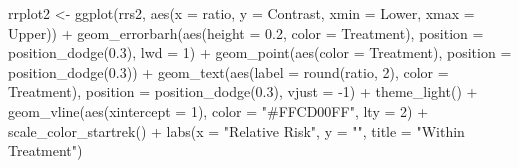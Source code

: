 \documentclass[12pt]{article}
\newenvironment{Shaded}{\begin{snugshade}}{\end{snugshade}}
\newcommand{\AttributeTok}[1]{\textcolor[rgb]{0.77,0.63,0.00}{#1}}
\newcommand{\DecValTok}[1]{\textcolor[rgb]{0.00,0.00,0.81}{#1}}
\newcommand{\FloatTok}[1]{\textcolor[rgb]{0.00,0.00,0.81}{#1}}
\newcommand{\FunctionTok}[1]{\textcolor[rgb]{0.00,0.00,0.00}{#1}}
\newcommand{\NormalTok}[1]{#1}
\newcommand{\OtherTok}[1]{\textcolor[rgb]{0.56,0.35,0.01}{#1}}
\newcommand{\SpecialCharTok}[1]{\textcolor[rgb]{0.00,0.00,0.00}{#1}}
\newcommand{\StringTok}[1]{\textcolor[rgb]{0.31,0.60,0.02}{#1}}
\begin{document}
\begin{Shaded}
\begin{Highlighting}[]
\NormalTok{rrplot2 }\OtherTok{\textless{}{-}} \FunctionTok{ggplot}\NormalTok{(rrs2, }\FunctionTok{aes}\NormalTok{(}\AttributeTok{x =}\NormalTok{ ratio, }\AttributeTok{y =}\NormalTok{ Contrast, }\AttributeTok{xmin =}\NormalTok{ Lower, }\AttributeTok{xmax =}\NormalTok{ Upper)) }\SpecialCharTok{+}
  \FunctionTok{geom\_errorbarh}\NormalTok{(}\FunctionTok{aes}\NormalTok{(}\AttributeTok{height =} \FloatTok{0.2}\NormalTok{, }\AttributeTok{color =}\NormalTok{ Treatment),}
                 \AttributeTok{position =} \FunctionTok{position\_dodge}\NormalTok{(}\FloatTok{0.3}\NormalTok{), }\AttributeTok{lwd =} \DecValTok{1}\NormalTok{) }\SpecialCharTok{+}
  \FunctionTok{geom\_point}\NormalTok{(}\FunctionTok{aes}\NormalTok{(}\AttributeTok{color =}\NormalTok{ Treatment), }\AttributeTok{position =} \FunctionTok{position\_dodge}\NormalTok{(}\FloatTok{0.3}\NormalTok{)) }\SpecialCharTok{+}
  \FunctionTok{geom\_text}\NormalTok{(}\FunctionTok{aes}\NormalTok{(}\AttributeTok{label =} \FunctionTok{round}\NormalTok{(ratio, }\DecValTok{2}\NormalTok{), }\AttributeTok{color =}\NormalTok{ Treatment), }
            \AttributeTok{position =} \FunctionTok{position\_dodge}\NormalTok{(}\FloatTok{0.3}\NormalTok{), }\AttributeTok{vjust =} \SpecialCharTok{{-}}\DecValTok{1}\NormalTok{) }\SpecialCharTok{+}
  \FunctionTok{theme\_light}\NormalTok{() }\SpecialCharTok{+}
  \FunctionTok{geom\_vline}\NormalTok{(}\FunctionTok{aes}\NormalTok{(}\AttributeTok{xintercept =} \DecValTok{1}\NormalTok{), }\AttributeTok{color =} \StringTok{"\#FFCD00FF"}\NormalTok{, }\AttributeTok{lty =} \DecValTok{2}\NormalTok{) }\SpecialCharTok{+}
  \FunctionTok{scale\_color\_startrek}\NormalTok{() }\SpecialCharTok{+}
  \FunctionTok{labs}\NormalTok{(}\AttributeTok{x =} \StringTok{"Relative Risk"}\NormalTok{, }\AttributeTok{y =} \StringTok{""}\NormalTok{, }\AttributeTok{title =} \StringTok{"Within Treatment"}\NormalTok{)}


\end{Highlighting}
\end{Shaded}
\end{document}
